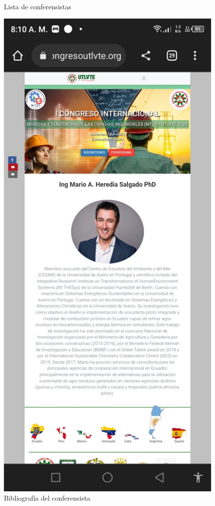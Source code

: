 \documentclass[a4paper,14px]{article}
\begin{document}
\begin{minipage}[H]{0.5\linewidth}
\begin{figure}[H]
    \caption{Lista de conferensistas}
    \label{fig:conferensistas}
  \end{figure}
\end{minipage}
\hspace{0.5cm}
\begin{minipage}[H]{0.5\linewidth}
  \begin{figure}[H]
    \centering
    \includegraphics[scale=0.3]{bibliografia.jpg}
    \caption{Bibliografía del conferensista}
    \label{fig:bibliografia}
  \end{figure}
\end{minipage}
\end{document}
